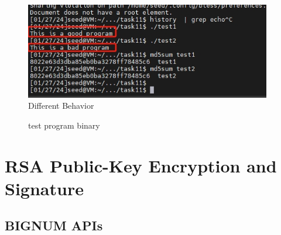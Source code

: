 \documentclass[a4paper,11pt]{article}
\begin{document}
\begin{figure}[h]
    \centering
       \includegraphics[width=0.96\textwidth]{figures/task11/differentbehaviors.png}
    \caption{Different Behavior}\label{fig:task11}
\end{figure}

\begin{figure}[h]
    \centering
    \hfill
    \hfill
    \caption{test program binary}\label{fig:task11tests}
\end{figure}


\section{RSA Public-Key Encryption and Signature}

\subsection{BIGNUM APIs}
\end{document}
